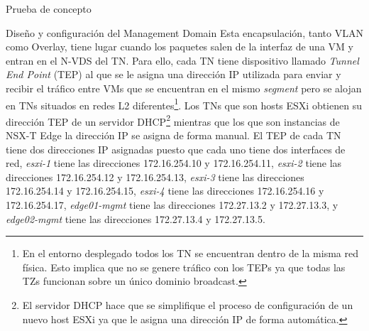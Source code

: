 \begin{section}{Prueba de concepto}
\begin{subsection}{Diseño y configuración del Management Domain}
    Esta encapsulación, tanto VLAN como Overlay, tiene lugar cuando los paquetes salen de la interfaz de una VM y entran en el N-VDS del TN. Para ello, cada TN tiene dispositivo llamado \textit{Tunnel End Point} (TEP) al que se le asigna una dirección IP utilizada para enviar y recibir el tráfico entre VMs que se encuentran en el mismo \textit{segment} pero se alojan en TNs situados en redes L2 diferentes\footnote{En el entorno desplegado todos los TN se encuentran dentro de la misma red física. Esto implica que no se genere tráfico con los TEPs ya que todas las TZs funcionan sobre un único dominio broadcast.}. Los TNs que son hosts ESXi obtienen su dirección TEP de un servidor DHCP\footnote{El servidor DHCP hace que se simplifique el proceso de configuración de un nuevo host ESXi ya que le asigna una dirección IP de forma automática.} mientras que los que son instancias de NSX-T Edge la dirección IP se asigna de forma manual. El TEP de cada TN tiene dos direcciones IP asignadas puesto que cada uno tiene dos interfaces de red, \textit{esxi-1} tiene las direcciones 172.16.254.10 y 172.16.254.11, \textit{esxi-2} tiene las direcciones 172.16.254.12 y 172.16.254.13, \textit{esxi-3} tiene las direcciones 172.16.254.14 y 172.16.254.15, \textit{esxi-4} tiene las direcciones 172.16.254.16 y 172.16.254.17, \textit{edge01-mgmt} tiene las direcciones 172.27.13.2 y 172.27.13.3, y \textit{edge02-mgmt} tiene las direcciones 172.27.13.4 y 172.27.13.5.
    

\end{subsection}
\end{section}
